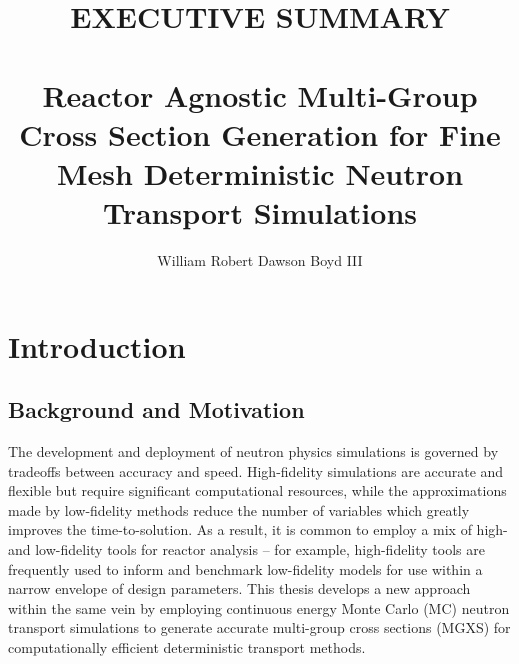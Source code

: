\documentclass[12pt,twoside]{mitthesis-exec}
\begin{document}

\title{EXECUTIVE SUMMARY \\~\\ Reactor Agnostic Multi-Group Cross Section Generation for Fine Mesh Deterministic Neutron Transport Simulations}

\author{William Robert Dawson Boyd III}





\setcounter{savepage}{\thepage}



\singlespacing 

\section*{Introduction}

\subsection*{Background and Motivation}

The development and deployment of neutron physics simulations is governed by tradeoffs between accuracy and speed. High-fidelity simulations are accurate and flexible but require significant computational resources, while the approximations made by low-fidelity methods reduce the number of variables which greatly improves the time-to-solution. As a result, it is common to employ a mix of high- and low-fidelity tools for reactor analysis -- for example, high-fidelity tools are frequently used to inform and benchmark low-fidelity models for use within a narrow envelope of design parameters. This thesis develops a new approach within the same vein by employing continuous energy Monte Carlo (MC) neutron transport simulations to generate accurate multi-group cross sections (MGXS) for computationally efficient deterministic transport methods.
\end{document}

